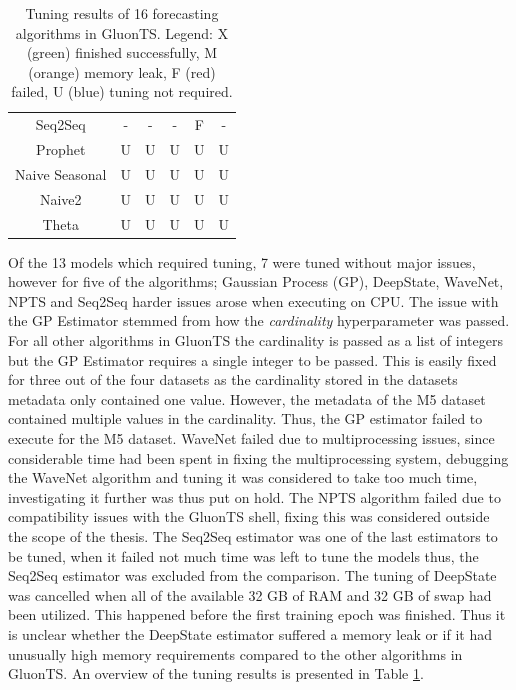 \begin{table}[htb]
\begin{tabular}{cccccc}
        Seq2Seq           & -                     & -                      & -                    & \cellcolor{red}F     & -                           \\
        Prophet           & \cellcolor{blue!25}U  & \cellcolor{blue!25}U   & \cellcolor{blue!25}U & \cellcolor{blue!25}U & \cellcolor{blue!25}U        \\
        Naive Seasonal    & \cellcolor{blue!25}U  & \cellcolor{blue!25}U   & \cellcolor{blue!25}U & \cellcolor{blue!25}U & \cellcolor{blue!25}U        \\
        Naive2            & \cellcolor{blue!25}U  & \cellcolor{blue!25}U   & \cellcolor{blue!25}U & \cellcolor{blue!25}U & \cellcolor{blue!25}U        \\
        Theta             & \cellcolor{blue!25}U  & \cellcolor{blue!25}U   & \cellcolor{blue!25}U & \cellcolor{blue!25}U & \cellcolor{blue!25}U        \\
        \hline
    \end{tabular}
    \caption{Tuning results of 16 forecasting algorithms in GluonTS. Legend: X (green) finished successfully, M (orange) memory leak, F (red) failed, U (blue) tuning not required.}
    \label{tab:tuning_results}
\end{table}

Of the 13 models which required tuning, 7 were tuned without major issues, however for five of the algorithms; Gaussian Process (GP), DeepState, WaveNet, NPTS and Seq2Seq harder issues arose when executing on CPU. The issue with the GP Estimator stemmed from how the \textit{cardinality} hyperparameter was passed. For all other algorithms in GluonTS the cardinality is passed as a list of integers but the GP Estimator requires a single integer to be passed. This is easily fixed for three out of the four datasets as the cardinality stored in the datasets metadata only contained one value. However, the metadata of the M5 dataset contained multiple values in the cardinality. Thus, the GP estimator failed to execute for the M5 dataset. WaveNet failed due to multiprocessing issues, since considerable time had been spent in fixing the multiprocessing system, debugging the WaveNet algorithm and tuning it was considered to take too much time, investigating it further was thus put on hold. The NPTS algorithm failed due to compatibility issues with the GluonTS shell, fixing this was considered outside the scope of the thesis. The Seq2Seq estimator was one of the last estimators to be tuned, when it failed not much time was left to tune the models thus, the Seq2Seq estimator was excluded from the comparison. The tuning of DeepState was cancelled when all of the available 32 GB of RAM and 32 GB of swap had been utilized. This happened before the first training epoch was finished. Thus it is unclear whether the DeepState estimator suffered a memory leak or if it had unusually high memory requirements compared to the other algorithms in GluonTS. An overview of the tuning results is presented in Table \ref{tab:tuning_results}.

